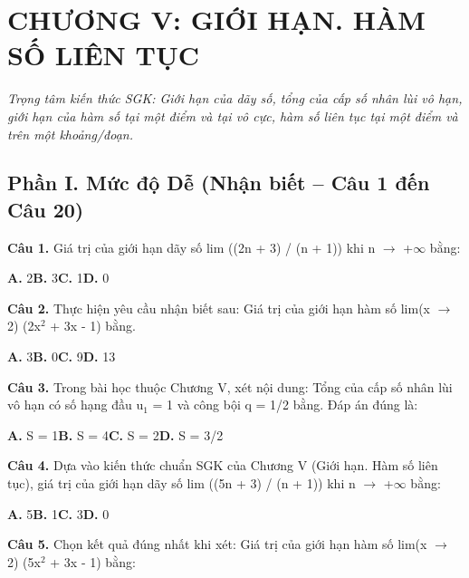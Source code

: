 \documentclass[11pt,a4paper]{article}
\begin{document}
\section*{\color{primary} CHƯƠNG V: GIỚI HẠN. HÀM SỐ LIÊN TỤC}
\textit{Trọng tâm kiến thức SGK: Giới hạn của dãy số, tổng của cấp số nhân lùi vô hạn, giới hạn của hàm số tại một điểm và tại vô cực, hàm số liên tục tại một điểm và trên một khoảng/đoạn.}\par\vspace{4pt}
\subsection*{\color{accent} Phần I. Mức độ Dễ (Nhận biết -- Câu 1 đến Câu 20)}
\textbf{\color{primary} Câu 1.} Giá trị của giới hạn dãy số lim ((2n + 3) / (n + 1)) khi n $\to$ +$\infty$ bằng:\par
\hspace*{1.5em}\textbf{A.} 2\quad\quad \textbf{B.} 3\quad\quad \textbf{C.} 1\quad\quad \textbf{D.} 0\par\vspace{2pt}
\textbf{\color{primary} Câu 2.} Thực hiện yêu cầu nhận biết sau: Giá trị của giới hạn hàm số lim(x $\to$ 2) (2x$^2$ + 3x - 1) bằng.\par
\hspace*{1.5em}\textbf{A.} 3\quad\quad \textbf{B.} 0\quad\quad \textbf{C.} 9\quad\quad \textbf{D.} 13\par\vspace{2pt}
\textbf{\color{primary} Câu 3.} Trong bài học thuộc Chương V, xét nội dung: Tổng của cấp số nhân lùi vô hạn có số hạng đầu u$_1$ = 1 và công bội q = 1/2 bằng. Đáp án đúng là:\par
\hspace*{1.5em}\textbf{A.} S = 1\quad\quad \textbf{B.} S = 4\quad\quad \textbf{C.} S = 2\quad\quad \textbf{D.} S = 3/2\par\vspace{2pt}
\textbf{\color{primary} Câu 4.} Dựa vào kiến thức chuẩn SGK của Chương V (Giới hạn. Hàm số liên tục), giá trị của giới hạn dãy số lim ((5n + 3) / (n + 1)) khi n $\to$ +$\infty$ bằng:\par
\hspace*{1.5em}\textbf{A.} 5\quad\quad \textbf{B.} 1\quad\quad \textbf{C.} 3\quad\quad \textbf{D.} 0\par\vspace{2pt}
\textbf{\color{primary} Câu 5.} Chọn kết quả đúng nhất khi xét: Giá trị của giới hạn hàm số lim(x $\to$ 2) (5x$^2$ + 3x - 1) bằng:\par
\end{document}
